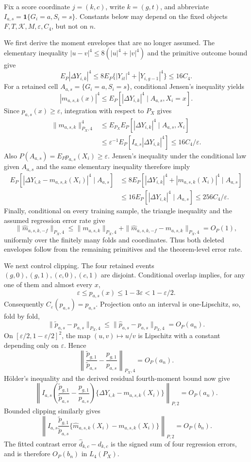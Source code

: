 Fix a score coordinate \(j=(k,c)\), write \(k=(g,t)\), and abbreviate \(I_{a,s}=\mathbf 1\{G_i=a,S_i=s\}\). Constants below may depend on the fixed objects \(F,T,\mathcal K,M,\varepsilon,C_4\), but not on \(n\).

We first derive the moment envelopes that are no longer assumed. The elementary inequality \(|u-v|^4\le 8(|u|^4+|v|^4)\) and the primitive outcome bound give
\[
 E_P|\Delta Y_{i,k}|^4
 \le 8E_P\{|Y_{it}|^4+|Y_{i,g-1}|^4\}
 \le16C_4.
\]
For a retained cell \(A_{a,s}=\{G_i=a,S_i=s\}\), conditional Jensen's inequality yields
\[
 |m_{a,s,k}(x)|^4
 \le E_P[|\Delta Y_{i,k}|^4\mid A_{a,s},X_i=x].
\]
Since \(p_{a,s}(x)\ge\varepsilon\), integration with respect to \(P_X\) gives
\[
\begin{aligned}
 \|m_{a,s,k}\|_{P_X,4}^4
 &\le E_{P_X}E_P[|\Delta Y_{i,k}|^4\mid A_{a,s},X_i]\\
 &\le\varepsilon^{-1}E_P[I_{a,s}|\Delta Y_{i,k}|^4]
 \le16C_4/\varepsilon.
\end{aligned}
\]
Also \(P(A_{a,s})=E_Pp_{a,s}(X_i)\ge\varepsilon\). Jensen's inequality under the conditional law given \(A_{a,s}\) and the same elementary inequality therefore imply
\[
\begin{aligned}
 E_P[|\Delta Y_{i,k}-m_{a,s,k}(X_i)|^4\mid A_{a,s}]
 &\le 8E_P[|\Delta Y_{i,k}|^4+|m_{a,s,k}(X_i)|^4\mid A_{a,s}]\\
 &\le16E_P[|\Delta Y_{i,k}|^4\mid A_{a,s}]
 \le256C_4/\varepsilon.
\end{aligned}
\]
Finally, conditional on every training sample, the triangle inequality and the assumed regression error rate give
\[
 \|\widehat m_{a,s,k,-f}\|_{P_X,4}
 \le \|m_{a,s,k}\|_{P_X,4}
     +\|\widehat m_{a,s,k,-f}-m_{a,s,k}\|_{P_X,4}
 =O_P(1),
\]
uniformly over the finitely many folds and coordinates. Thus both deleted envelopes follow from the remaining primitives and the theorem-level error rate.

We next control clipping. The four retained events \((g,0),(g,1),(c,0),(c,1)\) are disjoint. Conditional overlap implies, for any one of them and almost every \(x\),
\[
 \varepsilon\le p_{a,s}(x)\le1-3\varepsilon
 <1-\varepsilon/2.
\]
Consequently \(C_\varepsilon(p_{a,s})=p_{a,s}\). Projection onto an interval is one-Lipschitz, so, fold by fold,
\[
 \|\widetilde p_{a,s}-p_{a,s}\|_{P_X,4}
 \le\|\widehat p_{a,s}-p_{a,s}\|_{P_X,4}=O_P(a_n).
\]
On \([\varepsilon/2,1-\varepsilon/2]^2\), the map \((u,v)\mapsto u/v\) is Lipschitz with a constant depending only on \(\varepsilon\). Hence
\[
 \left\|\frac{\widetilde p_{g,1}}{\widetilde p_{a,s}}
       -\frac{p_{g,1}}{p_{a,s}}\right\|_{P_X,4}=O_P(a_n).
\]
H\"older's inequality and the derived residual fourth-moment bound now give
\[
 \left\|I_{a,s}\left(
 \frac{\widetilde p_{g,1}}{\widetilde p_{a,s}}
 -\frac{p_{g,1}}{p_{a,s}}\right)
 \{\Delta Y_{i,k}-m_{a,s,k}(X_i)\}\right\|_{P,2}=O_P(a_n).
\]
Bounded clipping similarly gives
\[
 \left\|I_{a,s}\frac{\widetilde p_{g,1}}{\widetilde p_{a,s}}
 \{\widehat m_{a,s,k}(X_i)-m_{a,s,k}(X_i)\}\right\|_{P,2}
 =O_P(b_n).
\]
The fitted contrast error \(\widehat d_{k,c}-d_{k,c}\) is the signed sum of four regression errors, and is therefore \(O_P(b_n)\) in \(L_4(P_X)\).

